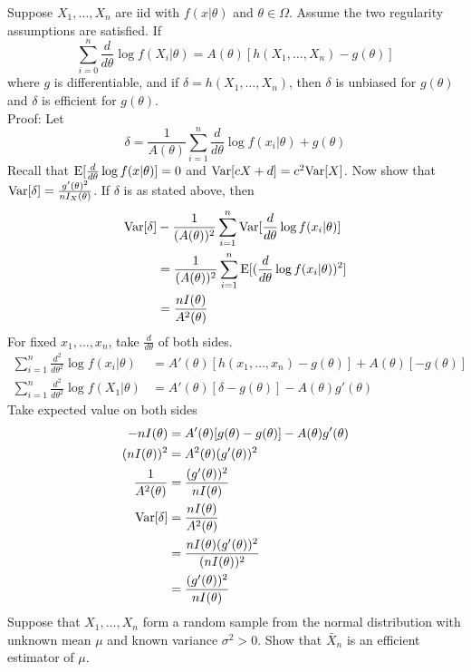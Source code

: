 \documentclass[12pt]{article}
\begin{document}
Suppose $X_1,\dots,X_n$ are iid with $f(x|\theta)$ and $\theta \in \Omega$. Assume the two regularity assumptions are satisfied. If $$\sum_{i=0}^n \frac{d}{d\theta} \log f(X_i | \theta) = A(\theta)[h(X_1,\dots,X_n) - g(\theta)] $$ where $g$ is differentiable, and if $\delta = h(X_1,\dots,X_n)$, then $\delta$ is unbiased for $g(\theta)$ and $\delta$ is efficient for $g(\theta)$. \\
Proof: Let $$\delta = \frac{1}{A(\theta)}\sum_{i=1}^n \frac{d}{d\theta} \log f(x_i | \theta) + g(\theta)$$ Recall that $\mathrm{E}[ \frac{d}{d\theta} \log f(x|\theta) ] = 0$ and $\mathrm{Var}[ cX + d ] = c^2\mathrm{Var}[ X ]$. Now show that $\mathrm{Var}[ \delta ] = \frac{g'(\theta)^2}{nI_X(\theta)} $. If $\delta$ is as stated above, then $$ \begin{aligned} \mathrm{Var}[ \delta ] &- \frac{1}{(A(\theta))^2} \sum_{i=1}^n \mathrm{Var}[ \frac{d}{d\theta} \log f(x_i | \theta) ] \\ &= \frac{1}{(A(\theta))^2} \sum_{i=1}^n \mathrm{E}[ (\frac{d}{d\theta} \log f(x_i | \theta))^2 ] \\ &= \frac{nI(\theta)}{A^2(\theta)} \end{aligned} $$ For fixed $x_1,\dots,x_n$, take $\frac{d}{d\theta}$ of both sides. $$ \begin{aligned} \sum_{i=1}^n \frac{d^2}{d\theta^2} \log f(x_i | \theta) &= A'(\theta)[h(x_1,\dots,x_n) - g(\theta)] + A(\theta)[-g(\theta)] \\ \sum_{i=1}^n \frac{d^2}{d\theta^2} \log f(X_1| \theta) &= A'(\theta)[\delta - g(\theta)] - A(\theta)g'(\theta) \end{aligned} $$ Take expected value on both sides $$ \begin{aligned} -nI(\theta) &= A'(\theta)[g(\theta) - g(\theta)] - A(\theta)g'(\theta) \\ (nI(\theta))^2 &= A^2(\theta)(g'(\theta))^2 \\ \frac{1}{A^2(\theta)} &= \frac{(g'(\theta))^2}{nI(\theta)} \\ \mathrm{Var}[ \delta ] &= \frac{nI(\theta)}{A^2(\theta)} \\ &= \frac{nI(\theta)(g'(\theta))^2}{(nI(\theta))^2} \\ &= \frac{(g'(\theta))^2}{nI(\theta)} \end{aligned} $$ 
Suppose that $X_1,\dots,X_n$ form a random sample from the normal distribution with unknown mean $\mu$ and known variance $\sigma^2 > 0$. Show that $\bar{X}_n$ is an efficient estimator of $\mu$. \\ 
\end{document}
